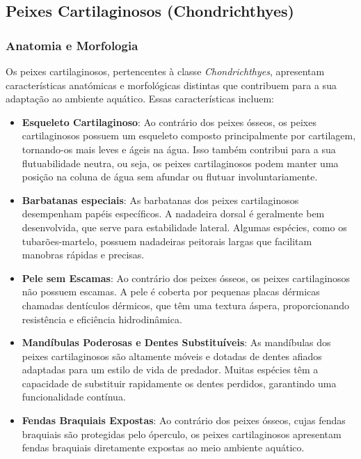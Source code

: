 \documentclass{report}
\begin{document}
\subsection{Peixes Cartilaginosos (Chondrichthyes)}
\subsubsection{Anatomia e Morfologia}
Os peixes cartilaginosos, pertencentes à classe \textit{Chondrichthyes}, apresentam características anatómicas e morfológicas distintas que contribuem para a sua adaptação ao ambiente aquático. Essas características incluem:
\begin{itemize}
	\item \textbf{Esqueleto Cartilaginoso}: Ao contrário dos peixes ósseos, os peixes cartilaginosos possuem um esqueleto composto principalmente por cartilagem, tornando-os mais leves e ágeis na água. Isso também contribui para a sua flutuabilidade neutra, ou seja, os peixes cartilaginosos podem manter uma posição na coluna de água sem afundar ou flutuar involuntariamente.
	
	\item \textbf{Barbatanas especiais}: As barbatanas dos peixes cartilaginosos desempenham papéis específicos. A nadadeira dorsal é geralmente bem desenvolvida, que serve para estabilidade lateral. Algumas espécies, como os tubarões-martelo, possuem nadadeiras peitorais largas que facilitam manobras rápidas e precisas.
	
	\item \textbf{Pele sem Escamas}: Ao contrário dos peixes ósseos, os peixes cartilaginosos não possuem escamas. A pele é coberta por pequenas placas dérmicas chamadas dentículos dérmicos, que têm uma textura áspera, proporcionando resistência e eficiência hidrodinâmica.
	
	\item \textbf{Mandíbulas Poderosas e Dentes Substituíveis}: As mandíbulas dos peixes cartilaginosos são altamente móveis e dotadas de dentes afiados adaptadas para um estilo de vida de predador. Muitas espécies têm a capacidade de substituir rapidamente os dentes perdidos, garantindo uma funcionalidade contínua.
	
	\item \textbf{Fendas Braquiais Expostas}: Ao contrário dos peixes ósseos, cujas fendas braquiais são protegidas pelo óperculo, os peixes cartilaginosos apresentam fendas braquiais diretamente expostas ao meio ambiente aquático.
\end{itemize} 
\end{document}

